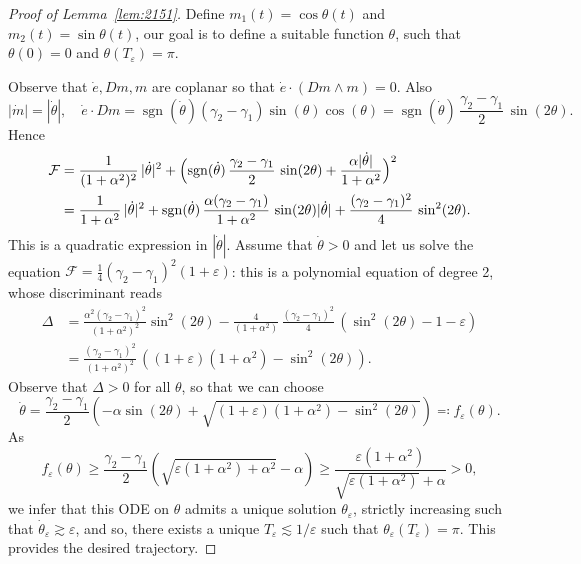 \documentclass[JEP,XML,SOM,Unicode,NoEqCountersInSection,NoFloatCountersInSection,published]{cedram}
\theoremstyle{definition}
\begin{document}
\begin{proof}[Proof of Lemma~\ref{lem:2151}]
Define $m_1(t) = \cos \theta(t)$ and $m_2(t) = \sin \theta(t)$, our goal is to define a suitable function $\theta$, such that $\theta(0)=0$ and $\theta(T_\varepsilon) = \pi$.

Observe that $\dot e, Dm, m$ are coplanar so that $\dot e\cdot (Dm\wedge m) =0$. Also
\[ |\dot m| = |\dot \theta|, \quad \dot e \cdot Dm = {\operatorname{sgn} (\dot{\theta})} (\gamma_2-\gamma_1) \sin(\theta) \cos(\theta) = \operatorname{sgn} (\dot{\theta})\, \frac{\gamma_2-\gamma_1}{2}\, \sin(2\theta). \]
Hence
\begin{align*}
\mathcal F &= \frac{1}{(1+\alpha^2)^2}\,|\dot \theta|^2 + \Bigl({\operatorname{sgn} (\dot{\theta})}\, \frac{\gamma_2-\gamma_1}{2}\, \sin(2\theta) + \frac{\alpha |\dot \theta|}{1+\alpha^2} \Bigr)^2 \\
& = \frac{1}{1+\alpha^2}\,|\dot \theta|^2 + {\operatorname{sgn} (\dot{\theta})}\, \frac{\alpha (\gamma_2-\gamma_1)}{1+\alpha^2}\, \sin(2\theta) |\dot \theta| + \frac{(\gamma_2-\gamma_1)^2}{4}\, \sin^2(2\theta).
\end{align*}
This is a quadratic expression in $|\dot \theta|$. {Assume that $\dot{\theta} > 0$ and let} us solve the equa\-tion $\mathcal F = \frac{1}{4} (\gamma_2 - \gamma_1)^2 (1+\varepsilon)$: this is a polynomial equation of degree 2, whose discriminant reads
\begin{align*}
\Delta & = \frac{\alpha^2 (\gamma_2-\gamma_1)^2}{(1+\alpha^2)^2} \sin^2(2\theta) - \frac{4}{ (1+\alpha^2)}\, \frac{(\gamma_2-\gamma_1)^2}{4}\, (\sin^2(2\theta) - 1 -\varepsilon) \\
& =\frac{(\gamma_2-\gamma_1)^2}{(1+\alpha^2)^2}\, {\left((1+ \varepsilon) (1+\alpha^2) - \sin^2(2\theta) \right)}.
\end{align*}
Observe that $\Delta >0$ for all $\theta$, so that we can choose
\[
\dot \theta = \frac{\gamma_2-\gamma_1}{2} \left(-\alpha \sin(2\theta) + \sqrt{ (1+ \varepsilon) (1+\alpha^2) - \sin^2(2\theta)}\right) \eqqcolon f_\varepsilon (\theta).
\]
As
\[ f_\varepsilon (\theta) \geq \frac{\gamma_2-\gamma_1}{2} \left({ \sqrt{\varepsilon (1 + \alpha^2) + \alpha^2} - \alpha} \right) \geq \frac{ \varepsilon (1 + \alpha^2)}{\sqrt{ \varepsilon (1 + \alpha^2)} + \alpha}>0, \] we infer that this ODE on $\theta$ admits a unique solution $\theta_\varepsilon $, strictly increasing such that $\dot \theta_\varepsilon \gtrsim \varepsilon $, and so, there exists a unique $T_\varepsilon \lesssim 1/\varepsilon $ such that $\theta_\varepsilon (T_\varepsilon) = \pi$. This provides the desired trajectory.
\end{proof}
\end{document}

